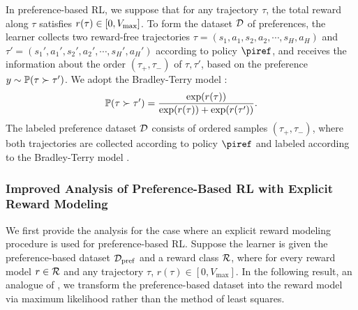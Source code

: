 \documentclass{article}
\begin{document}
In preference-based RL, we suppose that for any trajectory $\tau$, the total reward along $\tau$ satisfies $r(\tau)\in [0, {V_{\max}}]$. To form the dataset $\mathcal{D}$ of preferences, the learner collects two reward-free trajectories $\tau = (s_1, a_1, s_2, a_2, \cdots, s_H, a_H)$ and $\tau' = (s_1', a_1', s_2', a_2', \cdots, s_H', a_H')$ according to policy $\piref$, and receives the information about the order $(\tau_+, \tau_-)$ of $\tau,\tau'$, based on the preference $y\sim \mathbb{P}(\tau \succ \tau')$. We adopt the Bradley-Terry model \citep{bradley1952rank}:
\begin{equation}\label{eq: bt-reward}
    \mathbb{P}(\tau \succ \tau') = \frac{\exp(r(\tau))}{\exp(r(\tau)) + \exp(r(\tau'))}.
\end{equation}
The labeled preference dataset $\mathcal{D}$ consists of ordered samples $(\tau_+, \tau_-)$, where both trajectories are collected according to policy $\piref$ and labeled according to the Bradley-Terry model . 


\subsubsection{Improved Analysis of Preference-Based RL with Explicit Reward Modeling}

We first provide the analysis for the case where an explicit reward modeling procedure is used for preference-based RL.
Suppose the learner is given the preference-based dataset $\mathcal{D}_{\mathrm{pref}}$ and  a reward class $\mathcal{R}$, where for every reward model $r\in \mathcal{R}$ and any trajectory $\tau$, $r(\tau)\in [0, V_{\max}]$. In the following result, an analogue of , we transform the preference-based dataset into the reward model via maximum likelihood rather than the method of least squares.
\end{document}
